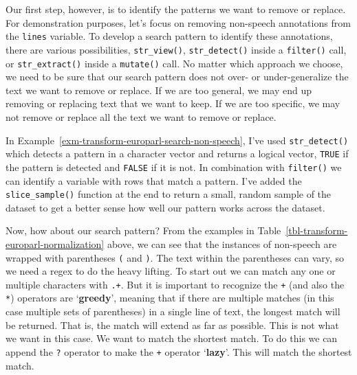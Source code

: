 \documentclass[
  letterpaper,
  krantz1]{latex/krantz-mod}
\theoremstyle{definition}
\theoremstyle{definition}
\theoremstyle{remark}
\begin{document}
Our first step, however, is to identify the patterns we want to remove
or replace. For demonstration purposes, let's focus on removing
non-speech annotations from the \texttt{lines} variable. To develop a
search pattern to identify these annotations, there are various
possibilities, \texttt{str\_view()}, \texttt{str\_detect()} inside a
\texttt{filter()} call, or \texttt{str\_extract()} inside a
\texttt{mutate()} call. No matter which approach we choose, we need to
be sure that our search pattern does not over- or under-generalize the
text we want to remove or replace. If we are too general, we may end up
removing or replacing text that we want to keep. If we are too specific,
we may not remove or replace all the text we want to remove or
replace.

In Example~\ref{exm-transform-europarl-search-non-speech}, I've used
\texttt{str\_detect()} which detects a pattern in a character vector and
returns a logical vector, \texttt{TRUE} if the pattern is detected and
\texttt{FALSE} if it is not. In combination with \texttt{filter()} we
can identify a variable with rows that match a pattern. I've added the
\texttt{slice\_sample()} function at the end to return a small, random
sample of the dataset to get a better sense how well our pattern works
across the dataset.

Now, how about our search pattern? From the examples in
Table~\ref{tbl-transform-europarl-normalization} above, we can see that
the instances of non-speech are wrapped with parentheses \texttt{(} and
\texttt{)}. The text within the parentheses can vary, so we need a regex
to do the heavy lifting. To start out we can match any one or multiple
characters with \texttt{.+}. But it is important to recognize the
\texttt{+} (and also the \texttt{*}) operators are
`\textbf{greedy}', meaning that
if there are multiple matches (in this case multiple sets of
parentheses) in a single line of text, the longest match will be
returned. That is, the match will extend as far as possible. This is not
what we want in this case. We want to match the shortest match. To do
this we can append the \texttt{?} operator to make the \texttt{+}
operator `\textbf{lazy}'. This will match the shortest
match.
\end{document}
